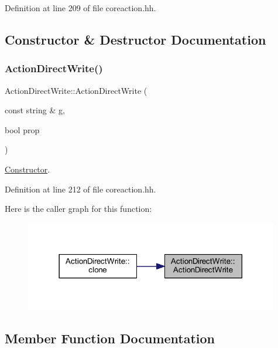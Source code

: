 Definition at line 209 of file coreaction.\+hh.



\subsection{Constructor \& Destructor Documentation}
\mbox{\label{class_action_direct_write_a241c61e946f8c1c31b961fd53bda0657}} 
\subsubsection{\texorpdfstring{ActionDirectWrite()}{ActionDirectWrite()}}
{\footnotesize\ttfamily Action\+Direct\+Write\+::\+Action\+Direct\+Write (\begin{DoxyParamCaption}\item[{const string \&}]{g,  }\item[{bool}]{prop }\end{DoxyParamCaption})\hspace{0.3cm}{\ttfamily [inline]}}



\mbox{\hyperlink{class_constructor}{Constructor}}. 



Definition at line 212 of file coreaction.\+hh.

Here is the caller graph for this function\+:
\nopagebreak
\begin{figure}[H]
\begin{center}
\leavevmode
\includegraphics[width=314pt]{class_action_direct_write_a241c61e946f8c1c31b961fd53bda0657_icgraph}
\end{center}
\end{figure}


\subsection{Member Function Documentation}
\mbox{\label{class_action_direct_write_a02ef8c3c9a53549db52478cd566e320f}} 
